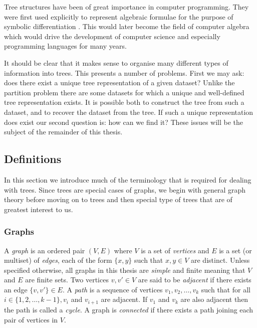 Tree structures have been of great importance in computer programming.  They
were first used explicitly to represent algebraic formulae for the purpose of
symbolic differentiation \citep{kahrimanian53differentiation}.  This would
later become the field of computer algebra which would drive the development
of computer science and especially programming languages for many years.

It should be clear that it makes sense to organise many different types of
information into trees.  This presents a number of problems.  First we may
ask: does there exist a unique tree representation of a given dataset?  Unlike
the partition problem there are some datasets for which a unique and
well-defined tree representation exists.  It is possible both to construct the
tree from such a dataset, and to recover the dataset from the tree.  If such a
unique representation does exist our second question is: how can we find it?
These issues will be the subject of the remainder of this thesis.

\subsection{Definitions}
\label{sec:definitions}

In this section we introduce much of the terminology that is required for
dealing with trees.  Since trees are special cases of graphs, we begin with
general graph theory before moving on to trees and then special type of trees
that are of greatest interest to us.

\subsubsection{Graphs}
\label{sec:graphs}

A \textit{graph} is an ordered pair $(V,E)$ where $V$ is a set of
\textit{vertices} and $E$ is a set (or multiset) of \textit{edges}, each of
the form $\{x,y\}$ such that $x,y \in V$ are distinct.  Unless specified
otherwise, all graphs in this thesis are \textit{simple} and finite meaning
that $V$ and $E$ are finite sets.  Two vertices $v,v' \in V$ are said to be
\textit{adjacent} if there exists an edge $\{v,v'\} \in E$.  A \textit{path}
is a sequence of vertices $v_1,v_2,\dotsc,v_k$ such that for all $i \in
\{1,2,\dotsc,k-1\}, v_i$ and $v_{i+1}$ are adjacent.  If $v_1$ and $v_k$ are
also adjacent then the path is called a \textit{cycle}.  A graph is
\textit{connected} if there exists a path joining each pair of vertices in
$V$.

